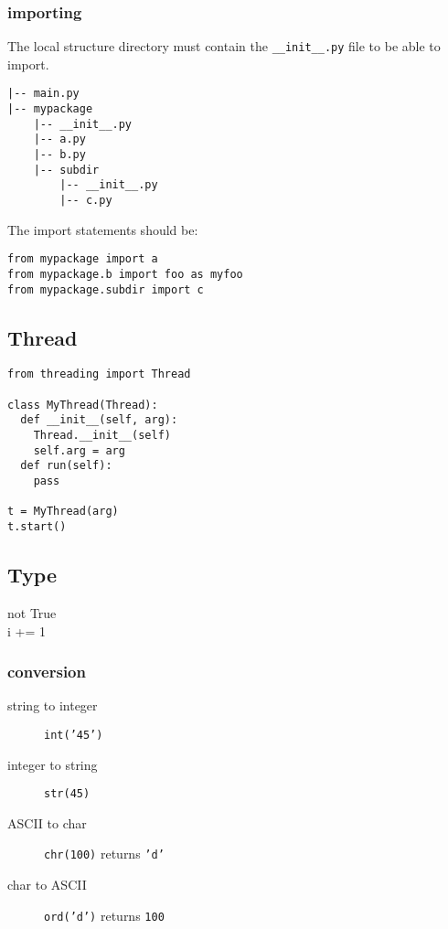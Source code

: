 \subsubsection{importing}
The local structure directory must contain the \verb$__init__.py$ file to be able to import.
\begin{lstlisting}
|-- main.py
|-- mypackage
    |-- __init__.py
    |-- a.py
    |-- b.py
    |-- subdir
        |-- __init__.py
        |-- c.py
\end{lstlisting}

The import statements should be:
\begin{lstlisting}
from mypackage import a
from mypackage.b import foo as myfoo
from mypackage.subdir import c
\end{lstlisting}

\subsection{Thread}
\begin{lstlisting}
from threading import Thread

class MyThread(Thread):
  def __init__(self, arg):
    Thread.__init__(self)
    self.arg = arg
  def run(self):
    pass

t = MyThread(arg)
t.start()
\end{lstlisting}





\subsection{Type}
\begin{description}
\item [not True]
\item [i += 1]
\end{description}
\subsubsection{conversion}
\begin{description}
\item [string to integer] \texttt{int('45')}
\item [integer to string] \texttt{str(45)}
\item [ASCII to char] \texttt{chr(100)} returns \texttt{'d'}
\item [char to ASCII] \texttt{ord('d')} returns \texttt{100}
\end{description}

